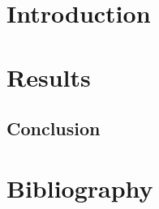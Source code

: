 \documentclass[12pt , a4paper]{article}
\begin{document}
	
	\newpage
	\section{Introduction}
	
	\newpage
	\section{Results}
	\subsection{Conclusion}
	 
	\newpage
	\section{Bibliography}
	
\end{document}
